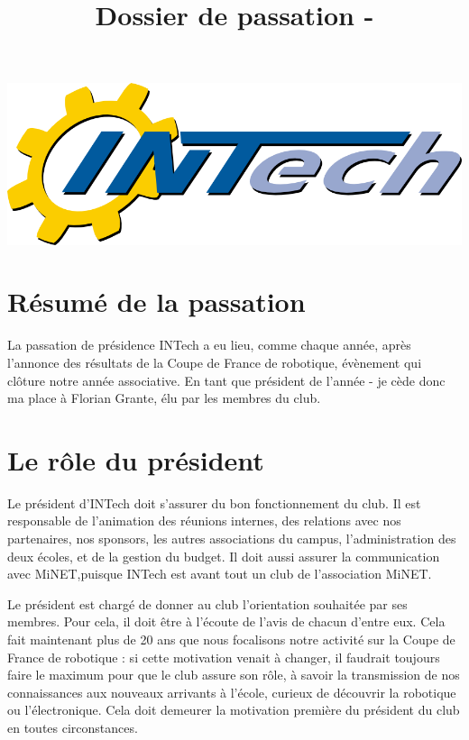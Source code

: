 \documentclass[a4paper,10pt]{article}
\title{Dossier de passation \theannee - \theanneesuiv}
\author{\ancienprez}
\newcommand{\nouveauprez}{Florian Grante}
\newcounter{annee}
\newcounter{anneeprec}
\begin{document}
\maketitle

\begin{center}
\includegraphics[scale=0.3]{logo-grand.png}
\end{center}


\section{Résumé de la passation}

La passation de présidence INTech a eu lieu, comme chaque année, après l'annonce des résultats de la Coupe de France de robotique, 
évènement qui clôture notre année associative. En tant que président de l'année \theanneeprec - \theannee \space je cède donc ma place à 
\nouveauprez, élu par les membres du club. 

\section{Le rôle du président}

Le président d'INTech doit s'assurer du bon fonctionnement du club. Il est responsable de l'animation des réunions internes,
des relations avec nos partenaires, nos sponsors, les autres associations du campus, l'administration des deux écoles, et de la gestion du budget.
Il doit aussi assurer la communication avec MiNET,puisque INTech est avant tout un club de l'association MiNET. \newline

Le président est chargé de donner au club l'orientation souhaitée par ses membres. Pour cela, il doit être à l'écoute de l'avis de chacun d'entre eux.
Cela fait maintenant plus de 20 ans que nous focalisons notre activité sur la Coupe de France de robotique : si cette motivation venait à changer, il faudrait toujours 
faire le maximum pour que le club assure son rôle, à savoir la transmission de nos connaissances aux nouveaux arrivants à l'école,
curieux de découvrir la robotique ou l'électronique. Cela doit demeurer la motivation première du président du club en toutes circonstances.\newline
\end{document}
